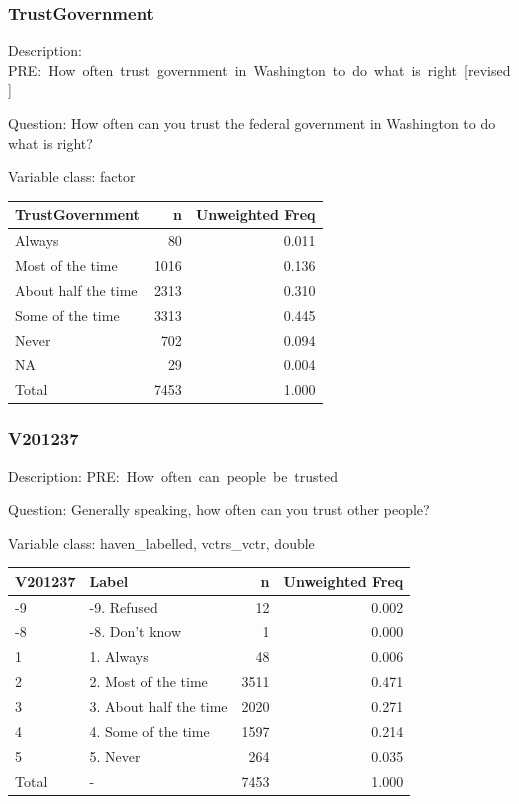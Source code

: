 \documentclass[
]{krantz}
\begin{document}
\hypertarget{trustgovernment}{%
\subsubsection*{TrustGovernment}\label{trustgovernment}}


Description: PRE:~How~often~trust~government~in~Washington~to~do~what~is~right~{[}revised{]}

Question: How often can you trust the federal government in Washington to do what is right?

Variable class: factor

\begin{tabular}[t]{l|r|r}
\hline
TrustGovernment & n & Unweighted Freq\\
\hline
Always & 80 & 0.011\\
\hline
Most of the time & 1016 & 0.136\\
\hline
About half the time & 2313 & 0.310\\
\hline
Some of the time & 3313 & 0.445\\
\hline
Never & 702 & 0.094\\
\hline
NA & 29 & 0.004\\
\hline
Total & 7453 & 1.000\\
\hline
\end{tabular}

\hypertarget{v201237}{%
\subsubsection*{V201237}\label{v201237}}


Description: PRE:~How~often~can~people~be~trusted

Question: Generally speaking, how often can you trust other people?

Variable class: haven\_labelled, vctrs\_vctr, double

\begin{tabular}[t]{l|l|r|r}
\hline
V201237 & Label & n & Unweighted Freq\\
\hline
-9 & -9. Refused & 12 & 0.002\\
\hline
-8 & -8. Don't know & 1 & 0.000\\
\hline
1 & 1. Always & 48 & 0.006\\
\hline
2 & 2. Most of the time & 3511 & 0.471\\
\hline
3 & 3. About half the time & 2020 & 0.271\\
\hline
4 & 4. Some of the time & 1597 & 0.214\\
\hline
5 & 5. Never & 264 & 0.035\\
\hline
Total & - & 7453 & 1.000\\
\hline
\end{tabular}
\end{document}
